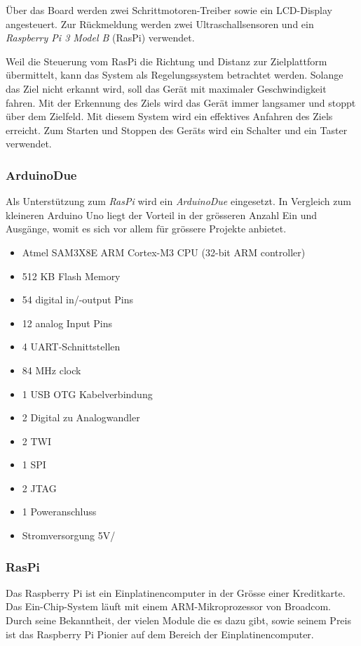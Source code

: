 \documentclass[a4paper]{report}
\begin{document}
Über das Board werden zwei Schrittmotoren-Treiber sowie ein LCD-Display angesteuert. Zur Rückmeldung werden zwei Ultraschallsensoren und ein \textit{Raspberry Pi 3 Model B} (RasPi) verwendet.

Weil die Steuerung vom RasPi die Richtung und Distanz zur Zielplattform übermittelt, kann das System als Regelungssystem betrachtet werden. Solange das Ziel nicht erkannt wird, soll das Gerät mit maximaler Geschwindigkeit fahren. Mit der Erkennung des Ziels wird das Gerät immer langsamer und stoppt über dem Zielfeld. Mit diesem System wird ein effektives Anfahren des Ziels erreicht. Zum Starten und Stoppen des Geräts wird ein Schalter und ein Taster verwendet.

\subsubsection{ArduinoDue}
\label{sssec:ArduinoDue}

Als Unterstützung zum \textit{RasPi} wird ein \textit{ArduinoDue} eingesetzt. In Vergleich zum kleineren Arduino Uno liegt der Vorteil in der grösseren Anzahl Ein und Ausgänge, womit es sich vor allem für grössere Projekte anbietet.



\begin{itemize}[noitemsep]
	\item Atmel SAM3X8E ARM Cortex-M3 CPU (32-bit ARM controller)
	\item 512 KB Flash Memory
	\item 54 digital in/-output Pins
	\item 12 analog Input Pins
	\item 4 UART-Schnittstellen
	\item 84 MHz clock
	\item 1 USB OTG Kabelverbindung
	\item 2 Digital zu Analogwandler
	\item 2 TWI
	\item 1 SPI
	\item 2 JTAG
	\item 1 Poweranschluss
	\item Stromversorgung 5V/
\end{itemize}\parencite{ArduinoDue2018}

\subsubsection{RasPi}
\label{sssec:RasPi}
Das Raspberry Pi ist ein Einplatinencomputer in der Grösse einer Kreditkarte. Das Ein-Chip-System läuft mit einem ARM-Mikroprozessor von Broadcom. Durch seine Bekanntheit, der vielen Module die es dazu gibt, sowie seinem Preis ist das Raspberry Pi Pionier auf dem Bereich der Einplatinencomputer.
\end{document}
